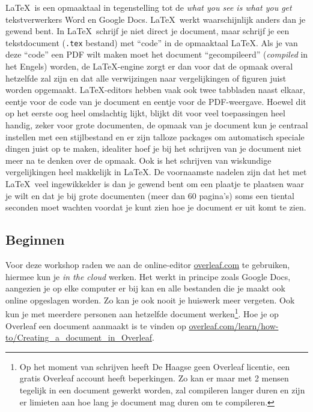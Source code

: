 \documentclass[dutch]{article}
\begin{document}
\LaTeX\ is een opmaaktaal in tegenstelling tot de \textit{what you see is what you get} tekstverwerkers Word en Google Docs.
\LaTeX\ werkt waarschijnlijk anders dan je gewend bent.
In \LaTeX\ schrijf je niet direct je document, maar schrijf je een tekstdocument (\texttt{.tex} bestand) met ``code'' in de opmaaktaal \LaTeX.
Als je van deze ``code'' een PDF wilt maken moet het document ``gecompileerd'' (\textit{compiled} in het Engels) worden, de \LaTeX-engine zorgt er dan voor dat de opmaak overal hetzelfde zal zijn en dat alle verwijzingen naar vergelijkingen of figuren juist worden opgemaakt.
\LaTeX-editors hebben vaak ook twee tabbladen naast elkaar, eentje voor de code van je document en eentje voor de PDF-weergave.
Hoewel dit op het eerste oog heel omslachtig lijkt, blijkt dit voor veel toepassingen heel handig, zeker voor grote documenten, de opmaak van je document kun je centraal instellen met een stijlbestand en er zijn talloze packages om automatisch speciale dingen juist op te maken, idealiter hoef je bij het schrijven van je document niet meer na te denken over de opmaak. Ook is het schrijven van wiskundige vergelijkingen heel makkelijk in \LaTeX.
De voornaamste nadelen zijn dat het met \LaTeX\ veel ingewikkelder is dan je gewend bent om een plaatje te plaatsen waar je wilt en dat je bij grote documenten (meer dan 60 pagina's) soms een tiental seconden moet wachten voordat je kunt zien hoe je document er uit komt te zien.

\subsection{Beginnen}
Voor deze workshop raden we aan de online-editor \href{https://www.overleaf.com}{overleaf.com} te gebruiken, hiermee kun je \textit{in the cloud} werken.
Het werkt in principe zoals Google Docs, aangezien je op elke computer er bij kan en alle bestanden die je maakt ook online opgeslagen worden.
Zo kan je ook nooit je huiswerk meer vergeten.
Ook kun je met meerdere personen aan hetzelfde document werken\footnote{Op het moment van schrijven heeft De Haagse geen Overleaf licentie, een gratis Overleaf account heeft beperkingen. Zo kan er maar met 2 mensen tegelijk in een document gewerkt worden, zal compileren langer duren en zijn er limieten aan hoe lang je document mag duren om te compileren.}.
Hoe je op Overleaf een document aanmaakt is te vinden op \href{https://www.overleaf.com/learn/how-to/Creating_a_document_in_Overleaf}{overleaf.com/learn/how-to/Creating\_a\_document\_in\_Overleaf}.
\end{document}
